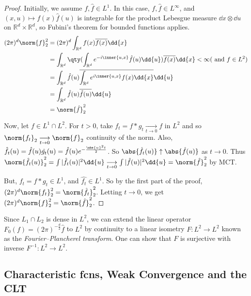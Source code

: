 \begin{proof}
	Initially, we assume $f, \hat f \in L^1$.
	In this case, $f, \hat f \in L^\infty$, and $(x,u) \mapsto f(x)\hat f(u)$ is integrable for the product Lebesgue measure $\dd{x} \otimes \dd{u}$ on $\mathbb R^d \times \mathbb R^d$, so Fubini's theorem for bounded functions applies.
	\begin{align*}
		(2\pi)^d \norm{f}_2^2 &= (2\pi)^d \int_{\mathbb R^d} f(x) \overline{f(x)} \dd{x} \\
		&= \int_{\mathbb R^d} \qty(\int_{\mathbb R^d} e^{-i\inner{u,x}} \hat f(u) \dd{u}) \overline{f(x)} \dd{x} < \infty (\text{ and } f \in L^2) \\
		&= \int_{\mathbb R^d} \hat f(u) \overline{\int_{\mathbb R^d} e^{i\inner{u,x}} f(x) \dd{x}} \dd{u} \\
		&= \int_{\mathbb R^d} \hat f(u) \overline{\hat f(u)} \dd{u} \\
		&= \norm{\hat f}_2^2
	\end{align*}

	Now, let $f \in L^1 \cap L^2$.
	For $t > 0$, take $f_t = f \ast g_t \underset{t \to 0}{\longrightarrow} f$ in $L^2$ and so $\norm{f_t}_2 \underset{t \to 0}{\longrightarrow} \norm{f}_2$ continuity of the norm.
	Also, $\hat{f_t}(u) = \hat{f}(u) \hat{g_t}(u) = \hat f(u) e^{-\frac{\abs{u}^2 t}{2}}$.
	So $\abs{\hat{f_t}(u)} \uparrow \abs{\hat{f}(u)}$ as $t \to 0$.
	Thus $\norm{\hat{f_t}(u)}_2^2 = \int |\hat{f_t}(u)|^2 \dd{u} \underset{t \to 0}{\longrightarrow} \int |\hat{f}(u)|^2 \dd{u} = \norm{\hat{f}}_2^2$ by MCT.

	But, $f_t = f \ast g_t \in L^1$, and $\hat{f_t} \in L^1$.
	So by the first part of the proof, $(2\pi)^d \norm{f_t}_2^2 = \norm{\hat{f_t}}_2^2$.
	Letting $t \to 0$, we get $(2\pi)^d \norm{f}_2^2 = \norm{\hat{f}}_2^2$.
\end{proof}

\begin{remark}
	Since $L_1 \cap L_2$ is dense in $L^2$, we can extend the linear operator $F_0(f) = (2\pi)^{-\frac{d}{2}} \hat f$ to $L^2$ by continuity to a linear isometry $F \colon L^2 \to L^2$ known as the \emph{Fourier--Plancherel transform}.
	One can show that $F$ is surjective with inverse $F^{-1} \colon L^2 \to L^2$.
\end{remark}

\subsection{Characteristic fcns, Weak Convergence and the CLT}

